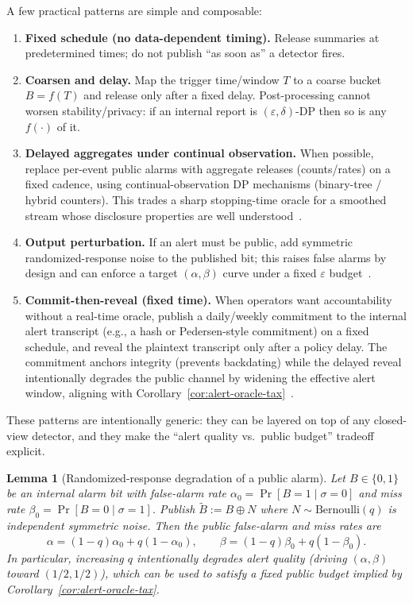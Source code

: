 \documentclass[11pt]{article}
\newtheorem{lemma}{Lemma}
\begin{document}
A few practical patterns are simple and composable:
\begin{enumerate}[leftmargin=*]
  \item \textbf{Fixed schedule (no data-dependent timing).} Release summaries at predetermined times; do not publish ``as soon as'' a detector fires.
  \item \textbf{Coarsen and delay.} Map the trigger time/window $T$ to a coarse bucket $B=f(T)$ and release only after a fixed delay. Post-processing cannot worsen stability/privacy: if an internal report is $(\varepsilon,\delta)$-DP then so is any $f(\cdot)$ of it.
  \item \textbf{Delayed aggregates under continual observation.} When possible, replace per-event public alarms with aggregate releases (counts/rates) on a fixed cadence, using continual-observation DP mechanisms (binary-tree / hybrid counters).
  This trades a sharp stopping-time oracle for a smoothed stream whose disclosure properties are well understood~\cite{dwork2010continual,chan2010continual,jain2023priceContinual,cohen2024continual_lowerbounds}.
  \item \textbf{Output perturbation.} If an alert must be public, add symmetric randomized-response noise to the published bit; this raises false alarms by design and can enforce a target $(\alpha,\beta)$ curve under a fixed $\varepsilon$ budget~\cite{warner1965randomizedresponse}.
  \item \textbf{Commit-then-reveal (fixed time).} When operators want accountability without a real-time oracle, publish a daily/weekly commitment to the internal alert transcript (e.g., a hash or Pedersen-style commitment) on a fixed schedule, and reveal the plaintext transcript only after a policy delay.
  The commitment anchors integrity (prevents backdating) while the delayed reveal intentionally degrades the public channel by widening the effective alert window, aligning with Corollary~\ref{cor:alert-oracle-tax}~\cite{pedersen1991distributedprovers}.
\end{enumerate}

These patterns are intentionally generic: they can be layered on top of any closed-view detector, and they make the ``alert quality vs.\ public budget'' tradeoff explicit.

\begin{lemma}[Randomized-response degradation of a public alarm]
\label{lem:rr-alarm}
Let $B\in\{0,1\}$ be an internal alarm bit with false-alarm rate $\alpha_0=\Pr[B{=}1\mid\sigma{=}0]$ and miss rate $\beta_0=\Pr[B{=}0\mid\sigma{=}1]$.
Publish $\widetilde B := B\oplus N$ where $N\sim\mathrm{Bernoulli}(q)$ is independent symmetric noise.
Then the public false-alarm and miss rates are
\[
\alpha = (1-q)\alpha_0 + q(1-\alpha_0),\qquad
\beta  = (1-q)\beta_0  + q(1-\beta_0).
\]
In particular, increasing $q$ intentionally degrades alert quality (driving $(\alpha,\beta)$ toward $(1/2,1/2)$), which can be used to satisfy a fixed public budget implied by Corollary~\ref{cor:alert-oracle-tax}.
\end{lemma}
\end{document}

